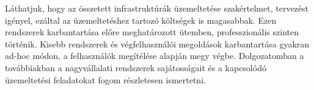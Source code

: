 Láthatjuk, hogy az összetett infrastruktúrák üzemeltetése szakértelmet, tervezést igényel, ezáltal az üzemeltetéshez tartozó költségek is magasabbak. Ezen rendszerek karbantartása előre meghatározott ütemben, professzionális szinten történik. Kisebb rendszerek és végfelhasználói megoldások karbantartása gyakran ad-hoc módon, a felhasználók megítélése alapján megy végbe. Dolgozatomban a továbbiakban a nagyvállalati rendszerek sajátosságait és a kapcsolódó üzemeltetési feladatokat fogom részletesen ismertetni.

